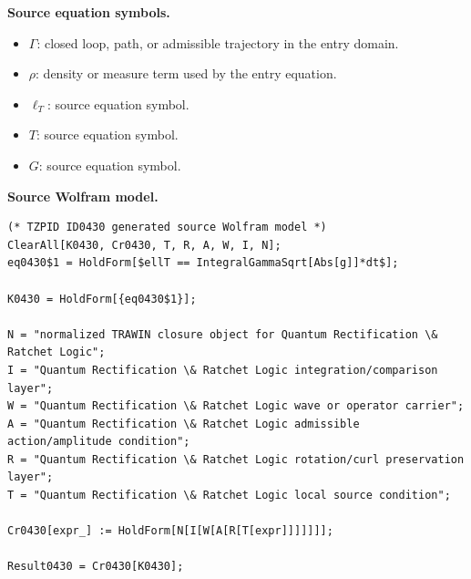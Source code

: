 \begin{minipage}[t]{0.49\linewidth}
\begingroup
\small
\raggedright
\textbf{Source equation symbols.}\par
\begin{itemize}[leftmargin=1.35em,itemsep=1pt,topsep=1pt,parsep=0pt]
    \item $\Gamma$: closed loop, path, or admissible trajectory in the entry domain.
    \item $\rho$: density or measure term used by the entry equation.
    \item $\ell_{T}$: source equation symbol.
    \item $T$: source equation symbol.
    \item $G$: source equation symbol.
\end{itemize}
\endgroup
\end{minipage}\hfill
\begin{minipage}[t]{0.47\linewidth}
\begingroup
\scriptsize
\raggedright
\textbf{Source Wolfram model.}\par
\begin{Verbatim}[fontsize=\tiny,breaklines=true,breakanywhere=true]
(* TZPID ID0430 generated source Wolfram model *)
ClearAll[K0430, Cr0430, T, R, A, W, I, N];
eq0430$1 = HoldForm[$ellT == IntegralGammaSqrt[Abs[g]]*dt$];

K0430 = HoldForm[{eq0430$1}];

N = "normalized TRAWIN closure object for Quantum Rectification \& Ratchet Logic";
I = "Quantum Rectification \& Ratchet Logic integration/comparison layer";
W = "Quantum Rectification \& Ratchet Logic wave or operator carrier";
A = "Quantum Rectification \& Ratchet Logic admissible action/amplitude condition";
R = "Quantum Rectification \& Ratchet Logic rotation/curl preservation layer";
T = "Quantum Rectification \& Ratchet Logic local source condition";

Cr0430[expr_] := HoldForm[N[I[W[A[R[T[expr]]]]]]];

Result0430 = Cr0430[K0430];
\end{Verbatim}
\endgroup
\end{minipage}

